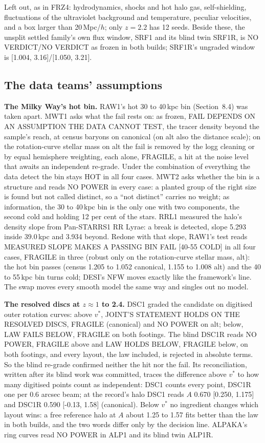 \documentclass[10pt]{article}
\begin{document}
Left out, as in FRZ4: hydrodynamics, shocks and hot halo gas, self-shielding, fluctuations of the ultraviolet background and temperature, peculiar velocities, and a box larger than 20\,Mpc/$h$; only $z=2.2$ has 12 seeds. Beside these, the unsplit settled family's own flux window, SRF1 and its blind twin SRF1R, is NO VERDICT/NO VERDICT as frozen in both builds; SRF1R's ungraded window is [1.004, 3.16]/[1.050, 3.21].

\subsection{The data teams' assumptions}
\textbf{The Milky Way's hot bin.} RAW1's hot 30 to 40\,kpc bin (Section~8.4) was taken apart. MWT1 asks what the fail rests on: as frozen, FAIL DEPENDS ON AN ASSUMPTION THE DATA CANNOT TEST, the tracer density beyond the sample's reach, at census baryons on canonical (on alt also the distance scale); on the rotation-curve stellar mass on alt the fail is removed by the logg cleaning or by equal hemisphere weighting, each alone, FRAGILE, a hit at the noise level that awaits an independent re-grade. Under the combination of everything the data detect the bin stays HOT in all four cases. MWT2 asks whether the bin is a structure and reads NO POWER in every case: a planted group of the right size is found but not called distinct, so a ``not distinct'' carries no weight; as information, the 30 to 40\,kpc bin is the only one with two components, the second cold and holding 12 per cent of the stars. RRL1 measured the halo's density slope from Pan-STARRS1 RR Lyrae: a break is detected, slope 5.293 inside 39.0\,kpc and 3.934 beyond. Redone with that slope, RAW1's test reads MEASURED SLOPE MAKES A PASSING BIN FAIL [40-55 COLD] in all four cases, FRAGILE in three (robust only on the rotation-curve stellar mass, alt): the hot bin passes (census 1.205 to 1.052 canonical, 1.155 to 1.008 alt) and the 40 to 55\,kpc bin turns cold; DESI's NFW moves exactly like the framework's line. The swap moves every smooth model the same way and singles out no model.

\textbf{The resolved discs at $z\approx1$ to 2.4.} DSC1 graded the candidate on digitised outer rotation curves: above $v^*$, JOINT'S STATEMENT HOLDS ON THE RESOLVED DISCS, FRAGILE (canonical) and NO POWER on alt; below, LAW FAILS BELOW, FRAGILE on both footings. The blind DSC1R reads NO POWER, FRAGILE above and LAW HOLDS BELOW, FRAGILE below, on both footings, and every layout, the law included, is rejected in absolute terms. So the blind re-grade confirmed neither the hit nor the fail. Its reconciliation, written after its blind work was committed, traces the difference above $v^*$ to how many digitised points count as independent: DSC1 counts every point, DSC1R one per 0.6 arcsec beam; at the record's halo DSC1 reads $A$ 0.670 [0.250, 1.175] and DSC1R 0.590 [-0.13, 1.58] (canonical). Below $v^*$ no ingredient changes which layout wins: a free reference halo at $A$ about 1.25 to 1.57 fits better than the law in both builds, and the two words differ only by the decision line. ALPAKA's ring curves read NO POWER in ALP1 and its blind twin ALP1R.
\end{document}
